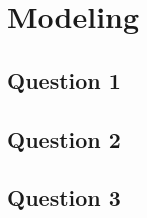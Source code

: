 \section{Modeling}\label{sec:modeling}

\subsection{Question 1}
\subsection{Question 2}
\subsection{Question 3}